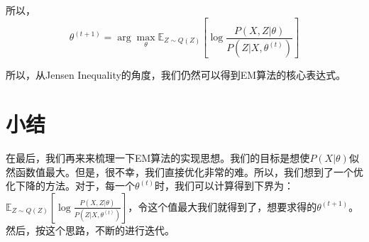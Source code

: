 \documentclass[a4paper]{article}
\begin{document}
所以，
\begin{equation}
    \theta^{(t+1)} = \arg\max_{\theta} \mathbb{E}_{Z\sim Q(Z)}\left[ \log \frac{P(X,Z|\theta)}{P(Z|X,\theta^{(t)})} \right]
\end{equation}

所以，从Jensen Inequality的角度，我们仍然可以得到EM算法的核心表达式。

\section{小结}
在最后，我们再来来梳理一下EM算法的实现思想。我们的目标是想使$P(X|\theta)$似然函数值最大。但是，很不幸，我们直接优化非常的难。所以，我们想到了一个优化下降的方法。对于，每一个$\theta^{(t)}$时，我们可以计算得到下界为：$\mathbb{E}_{Z\sim Q(Z)}\left[ \log \frac{P(X,Z|\theta)}{P(Z|X,\theta^{(t)})} \right]$，令这个值最大我们就得到了，想要求得的$\theta^{(t+1)}$。然后，按这个思路，不断的进行迭代。
\end{document}
